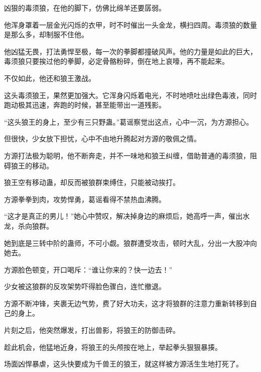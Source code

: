 \begin{this_body}
凶狠的毒须狼，在他的脚下，仿佛比绵羊还要孱弱。

他浑身罩着一层金光闪烁的衣甲，时不时催出一头金龙，横扫四周。毒须狼的数量是那么多，却制服不住他。

他凶猛无畏，打法勇悍至极，每一次的拳脚都撞破风声。他的力量是如此的巨大，毒须狼只要挨过他的拳脚，必定骨骼粉碎，倒在地上哀嚎，再不能起来。

不仅如此，他还和狼王激战。

这头毒须狼王，果然更加强大。它浑身闪烁着电光，不时地喷吐出绿色毒液，同时跑动极其迅速，奔跑的时候，甚至能带出一道残影。

“这头狼王的身上，至少有三只野蛊。”葛谣察觉出这点，心中一沉，为方源担心。

但很快，少女放下担忧，心中不由地升腾起对方源的敬佩之情。

方源打法极为聪明，他不断奔走，并不一味地和狼王纠缠，借助普通的毒须狼，阻碍狼王的移动。

狼王空有移动蛊，却反而被狼群束缚住，只能被动挨打。

方源拳拳到肉，攻势悍勇，葛谣看得不禁热血沸腾。

“这才是真正的男儿！”她心中赞叹，解决掉身边的麻烦后，她高呼一声，催出水龙，杀向狼群。

她到底是三转中阶的蛊师，不可小觑。狼群遭受攻击，顿时大乱，分出一大股冲向她去。

方源脸色顿变，开口喝斥：“谁让你来的？快一边去！”

少女被这狼群的反攻架势吓得脸色骤白，连忙撤退。

方源不断冲锋，夹裹无边气势，费了好大功夫，这才将狼群的注意力重新转移到自己的身上。

片刻之后，他突然爆发，打出兽影，将狼王的防御击碎。

趁此机会，他猛地近身，将狼王的头颅按在地上，举起拳头狠狠暴揍。

场面凶悍暴虐，这头快要成为千兽王的狼王，就这样被方源活生生地打死了。

\end{this_body}

